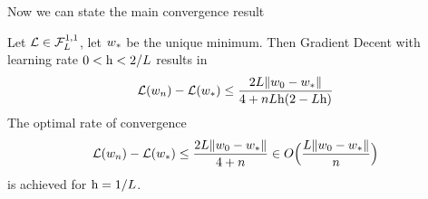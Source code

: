 Now we can state the main convergence result

\begin{theorem}
	\label{thm: convex function GD loss upper bound}
	Let \(\mathcal{L}\in\mathcal{F}^{1,1}_{L}\), let \(w_*\) be the unique minimum.
	Then Gradient Decent with learning rate \(0 < \text{h} < 2/L\) results in
	\begin{align}\label{eq: convex function loss upper bound}
		\mathcal{L}(w_n) - \mathcal{L}(w_*)
		\le \frac{2L\|w_0 - w_*\|}{4 + nL\text{h}(2-L\text{h})}
	\end{align}
	The optimal rate of convergence 
	\begin{align*}
		\mathcal{L}(w_n) - \mathcal{L}(w_*)
		\le \frac{2L\|w_0-w_*\|}{4+n}
		\in O\Big(\frac{L\|w_0-w_*\|}{n}\Big)
	\end{align*}
	is achieved for \(\text{h}=1/L\).
\end{theorem}
